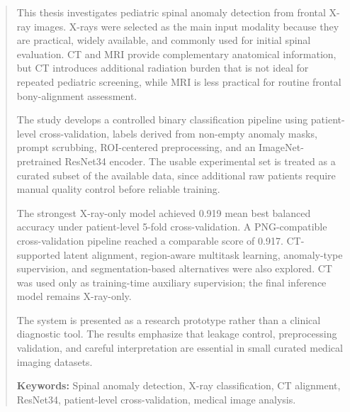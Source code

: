 \begin{abstract}
    This thesis investigates pediatric spinal anomaly detection from frontal X-ray images. X-rays were selected as the main input modality because they are practical, widely available, and commonly used for initial spinal evaluation. CT and MRI provide complementary anatomical information, but CT introduces additional radiation burden that is not ideal for repeated pediatric screening, while MRI is less practical for routine frontal bony-alignment assessment.

The study develops a controlled binary classification pipeline using patient-level cross-validation, labels derived from non-empty anomaly masks, prompt scrubbing, ROI-centered preprocessing, and an ImageNet-pretrained ResNet34 encoder. The usable experimental set is treated as a curated subset of the available data, since additional raw patients require manual quality control before reliable training.

The strongest X-ray-only model achieved 0.919 mean best balanced accuracy under patient-level 5-fold cross-validation. A PNG-compatible cross-validation pipeline reached a comparable score of 0.917. CT-supported latent alignment, region-aware multitask learning, anomaly-type supervision, and segmentation-based alternatives were also explored. CT was used only as training-time auxiliary supervision; the final inference model remains X-ray-only.

The system is presented as a research prototype rather than a clinical diagnostic tool. The results emphasize that leakage control, preprocessing validation, and careful interpretation are essential in small curated medical imaging datasets.

\textbf{Keywords:} Spinal anomaly detection, X-ray classification, CT alignment, ResNet34, patient-level cross-validation, medical image analysis.
\end{abstract}
